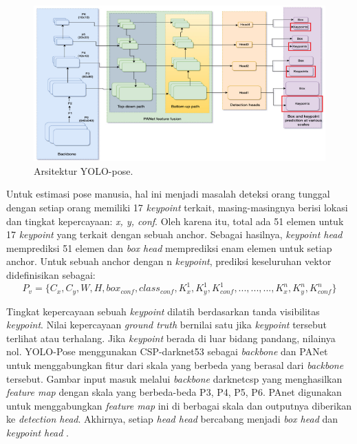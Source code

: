 \begin{figure}[ht]
  \centering
  \includegraphics[scale=0.9]{gambar/yolo-architecture.png}
  \caption{Arsitektur YOLO-pose.}
  \label{fig:YOLO-pose-architecture}
\end{figure}
\newpage
Untuk estimasi pose manusia, hal ini menjadi masalah deteksi orang tunggal dengan setiap orang memiliki 17 \emph{keypoint} terkait, masing-masingnya berisi lokasi dan tingkat kepercayaan: \emph{{x, y, conf}}.
Oleh karena itu, total ada 51 elemen untuk 17 \emph{keypoint} yang terkait dengan sebuah anchor. Sebagai hasilnya, \emph{keypoint head} memprediksi 51 elemen dan \emph{box head} memprediksi enam elemen untuk setiap anchor.
Untuk sebuah anchor dengan n \emph{keypoint}, prediksi keseluruhan vektor didefinisikan sebagai:
\begin{equation}
  \label{eq:yoloresult}
  P_v = \bigl\{ C_x, C_y, W, H, box_{conf}, class_{conf}, K_x^1, K_y^1, K_{conf}^1, ..., ..., ..., K_x^n, K_y^n, K_{conf}^n \bigr\}
\end{equation}

Tingkat kepercayaan sebuah \emph{keypoint} dilatih berdasarkan tanda visibilitas \emph{keypoint}. Nilai kepercayaan \emph{ground truth} bernilai satu jika \emph{keypoint} tersebut terlihat atau terhalang. Jika \emph{keypoint} berada di luar bidang pandang, nilainya nol.
YOLO-Pose menggunakan CSP-darknet53 \parencite{wang2020} sebagai \emph{backbone} dan PANet \parencite{liu2018} untuk menggabungkan fitur dari skala yang berbeda yang berasal dari \emph{backbone} tersebut.
Gambar input masuk melalui \emph{backbone} darknetcsp yang menghasilkan \emph{feature map} dengan skala yang berbeda-beda {P3, P4, P5, P6}.
PAnet digunakan untuk menggabungkan \emph{feature map} ini di berbagai skala dan outputnya diberikan ke \emph{detection head}.
Akhirnya, setiap \emph{head head} bercabang menjadi \emph{box head} dan \emph{keypoint head} \parencite{maji2022yolopose}.

